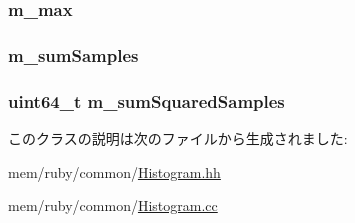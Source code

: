 \label{classHistogram_a3ee3ad96f4970cc4f3b761c36f18d97b}
\hypertarget{classHistogram_a9dbbdb7de023c9e3620bb2ce87952c35}{
\subsubsection[{m\_\-max}]{ {\bf m\_\-max}}}
\label{classHistogram_a9dbbdb7de023c9e3620bb2ce87952c35}
\hypertarget{classHistogram_a5afb7e042a0db65332d043743d6b5b75}{
\subsubsection[{m\_\-sumSamples}]{ {\bf m\_\-sumSamples}}}
\label{classHistogram_a5afb7e042a0db65332d043743d6b5b75}
\hypertarget{classHistogram_a85d495b4b3972c42d6ababbb865c7260}{
\subsubsection[{m\_\-sumSquaredSamples}]{\setlength{\rightskip}{0pt plus 5cm}uint64\_\-t {\bf m\_\-sumSquaredSamples}}}
\label{classHistogram_a85d495b4b3972c42d6ababbb865c7260}


このクラスの説明は次のファイルから生成されました:\begin{DoxyCompactItemize}
\item 
mem/ruby/common/\hyperlink{Histogram_8hh}{Histogram.hh}\item 
mem/ruby/common/\hyperlink{Histogram_8cc}{Histogram.cc}\end{DoxyCompactItemize}
